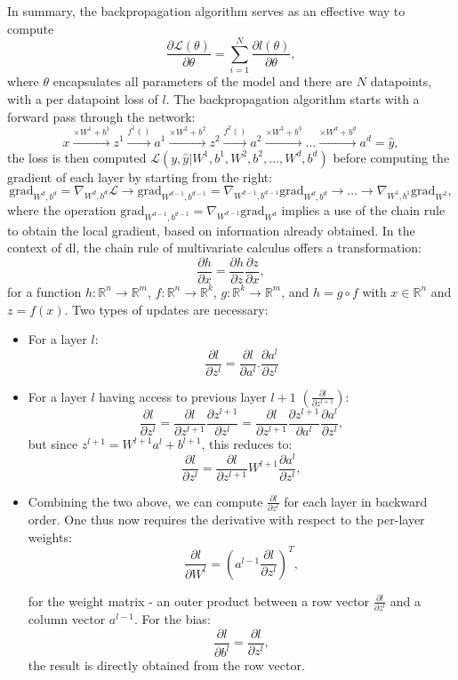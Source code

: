 In summary, the backpropagation algorithm serves as an effective way to compute \[ \frac{\partial\mathcal{L}(\theta)}{\partial\theta} = \sum_{i=1}^N \frac{\partial l(\theta)}{\partial\theta},\] 
where $\theta$ encapsulates all parameters of the model and there are $N$ datapoints, with a per datapoint loss of $l$. 
The backpropagation algorithm starts with a forward pass through the network: \[ x \xrightarrow{\times W^1 + b^1} z^1 \xrightarrow{f^1()} a^1 \xrightarrow{\times W^2 + b^2} z^2 \xrightarrow{f^2()} a^2 \xrightarrow{\times W^3 + b^3} ... \xrightarrow{\times W^d + b^d} a^d = \hat{y},\] the loss is then computed $\mathcal{L}(y, \hat{y} | W^1, b^1, W^2, b^2, ..., W^d, b^d)$ before computing the gradient of each layer by starting from the right:\[\text{grad}_{W^d, b^d} = \nabla_{W^d, b^d} \mathcal{L} \rightarrow \text{grad}_{W^{d-1}, b^{d-1}} = \nabla_{W^{d-1}, b^{d-1}} \text{grad}_{W^d, b^d} \rightarrow ... \rightarrow \nabla_{W^{1}, b^1} \text{grad}_{W^2}, \]
where the operation $\text{grad}_{W^{d-1}, b^{d-1}} = \nabla_{W^{d-1}} \text{grad}_{W^d}$ implies a use of the chain rule to obtain the local gradient, based on information already obtained. In the context of \gls{dl}, the chain rule of multivariate calculus offers a transformation:
\begin{equation}
    \frac{\partial h}{\partial x} = \frac{\partial h}{\partial z}\frac{\partial z}{\partial x},
\end{equation}
for a function $h: \mathbb{R}^n \rightarrow \mathbb{R}^m$, $f: \mathbb{R}^n \rightarrow \mathbb{R}^k$, $g: \mathbb{R}^k \rightarrow \mathbb{R}^m$, and $h = g \circ f$ with $x \in \mathbb{R}^n$ and $z = f(x)$. Two types of updates are necessary: 
\begin{itemize}
    \item For a layer $l$: \[\frac{\partial l}{\partial z^l} = \frac{\partial l}{\partial a^l} . \frac{\partial a^l}{\partial z^l}\]
    \item For a layer $l$ having access to previous layer $l+1$ $(\frac{\partial l}{\partial z^{l+1}})$: \[\frac{\partial l}{\partial z^l} = \frac{\partial l}{\partial z^{l+1}} \frac{\partial z^{l+1}}{\partial z^l} = \frac{\partial l}{\partial z^{l+1}} \frac{\partial z^{l+1}}{\partial a^l} \frac{\partial a^l}{\partial z^l}, \] but since $z^{l+1} = W^{l+1}a^l + b^{l+1}$, this reduces to:\[\frac{\partial l}{\partial z^l} = \frac{\partial l}{\partial z^{l+1}} W^{l+1} \frac{\partial a^l}{\partial z^l}, \]

    \item Combining the two above, we can compute $\frac{\partial l}{\partial z^l}$ for each layer in backward order. One thus now requires the derivative with respect to the per-layer weights: \[\frac{\partial l}{\partial W^l} = (a^{l-1} \frac{\partial l}{\partial z^l})^T,\] 
    
    for the weight matrix - an outer product between a row vector $\frac{\partial l}{\partial z^l}$ and a column vector $a^{l-1}$. For the bias: \[\frac{\partial l}{\partial b^l} = \frac{\partial l}{\partial z^l},\] the result is directly obtained from the row vector. 
\end{itemize}

